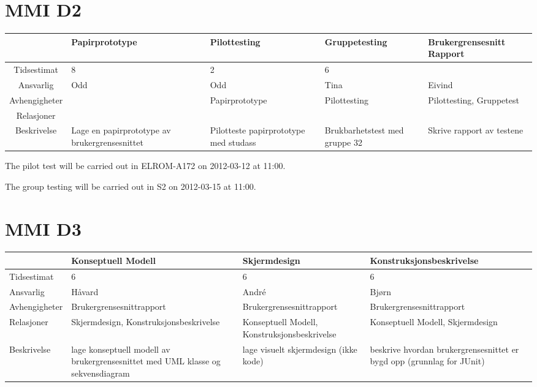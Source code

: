 \documentclass{article}
\begin{document}
\section{MMI D2}

\begin{tabular}{|c|p{3cm}|p{3cm}|p{3cm}|p{3cm}|}
\hline
& Papirprototype & Pilottesting & Gruppetesting & Brukergrensesnitt Rapport
\\ \hline
Tidsestimat & 8 & 2 & 6 &  \\ \hline
Ansvarlig & Odd & Odd & Tina & Eivind \\ \hline
Avhengigheter &  & Papirprototype & Pilottesting & Pilottesting, Gruppetest
\\ \hline
Relasjoner &  &  &  &  \\ \hline
Beskrivelse & Lage en papirprototype av brukergrensesnittet & Pilotteste
papirprototype med studass & Brukbarhetstest med gruppe 32 & Skrive rapport
av testene \\ \hline
\end{tabular}

The pilot test will be carried out in ELROM-A172 on 2012-03-12 at 11:00.

The group testing will be carried out in S2 on 2012-03-15 at 11:00.

\section{MMI D3}

\begin{tabular}{|l|p{4cm}|p{4cm}|p{4cm}|}
\hline
& Konseptuell Modell & Skjermdesign & Konstruksjonsbeskrivelse \\ \hline
Tidsestimat & 6 & 6 & 6 \\ \hline
Ansvarlig & H\aa vard & Andr\'{e} & Bj\o rn \\ \hline
Avhengigheter & Brukergrensesnittrapport & Brukergrensesnittrapport & 
Brukergrensesnittrapport \\ \hline
Relasjoner & Skjermdesign, Konstruksjonsbeskrivelse & Konseptuell Modell,
Konstruksjonsbeskrivelse & Konseptuell Modell, Skjermdesign \\ \hline
Beskrivelse & lage konseptuell modell av brukergrensesnittet med UML klasse
og sekvensdiagram & lage visuelt skjermdesign (ikke kode) & beskrive hvordan
brukergrensesnittet er bygd opp (grunnlag for JUnit) \\ \hline
\end{tabular}
\end{document}

